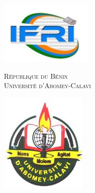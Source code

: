 \documentclass[10pt,a4paper]{article}
\author{Tafsir GNA}
\begin{document}
\setcounter{section}{0}

	\begin{titlepage}
		\centering
		
		\noindent%
		
		\begin{minipage}{.15\linewidth}
			\includegraphics[scale=0.4]{img/ifri_logo.png}
		\end{minipage}
		\hfill
		\begin{minipage}{.68\linewidth}\centering
			\textsc{République du Bénin}\\
			\vspace*{.5cm}
			\textsc{\Large Université d'Abomey-Calavi}
		\end{minipage}
		\hfill
		\begin{minipage}{.15\linewidth}
			\includegraphics[width=1\linewidth]{img/uac_logo.png}
		\end{minipage}
				

\end{titlepage}
\end{document}
